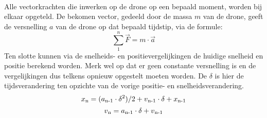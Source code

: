 \\
Alle vectorkrachten die inwerken op de drone op een bepaald moment, worden bij elkaar opgeteld. De bekomen vector, gedeeld door de massa \(m\) van de drone, geeft de versnelling \(a\) van de drone op dat bepaald tijdstip, via de formule:
\\
\begin{equation*}
\sum_{1}^{n} \vec{F} = m \cdot \vec{a} \label{krachtenevenwicht}
\end{equation*}
Ten slotte kunnen via de snelheids- en positievergelijkingen de huidige snelheid en positie berekend worden. Merk wel op dat er geen constante versnelling is en de vergelijkingen dus telkens opnieuw opgestelt moeten worden. De \(\delta\) is hier de tijdsverandering ten opzichte van de vorige positie- en snelheidsverandering.
\\
\begin{equation*}
x\textsubscript{n} = (a\textsubscript{n-1} \cdot \delta\textsuperscript{2})/2 + v\textsubscript{n-1} \cdot \delta + x\textsubscript{n-1} \label{positie}
\end{equation*}
\begin{equation*}
v\textsubscript{n} = a\textsubscript{n-1} \cdot \delta + v\textsubscript{n-1} \label{snelheid}
\end{equation*}